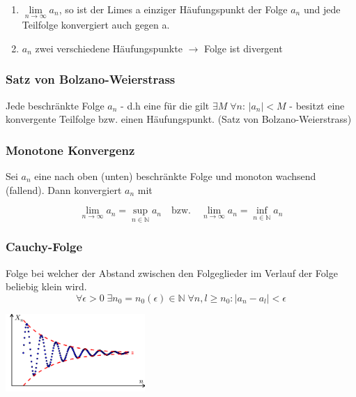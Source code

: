 \documentclass[6pt]{article}
\begin{document}
\begin{multicols*}{3}
\begin{enumerate}[label=(\roman*), itemsep=2pt, parsep=2pt]
		\item $\lim\limits_{n \to \infty}  a_n$, so ist der Limes a einziger H{\"a}ufungspunkt der Folge $a_n$ und jede Teilfolge konvergiert auch gegen a. 
		\item $a_n$ zwei verschiedene H{\"a}ufungspunkte $\rightarrow$ Folge ist divergent
\end{enumerate}



\subsubsection*{Satz von Bolzano-Weierstrass}
Jede beschr{\"a}nkte Folge $a_n$ - d.h eine f{\"u}r die gilt $\exists M \; \forall n:\, |a_n|<M$ - besitzt eine 
		konvergente Teilfolge bzw. einen H{\"a}ufungspunkt. (Satz von Bolzano-Weierstrass) 
		
\subsubsection*{Monotone Konvergenz}
				Sei $a_n$ eine nach oben (unten) beschr{\"a}nkte Folge und monoton wachsend (fallend). 	Dann konvergiert $a_n$ mit 
					
					\begin{equation*}
  							\lim_{n \to \infty} a_n = \sup_{n \in \mathbb{N}} a_n \quad \text{bzw.} \quad  \lim_{n \to \infty} a_n = \inf_{n \in\mathbb{N}} a_n
					\end{equation*}

\vspace{15mm}
\quad

\columnbreak

\subsubsection*{Cauchy-Folge}
Folge bei welcher der Abstand zwischen den Folgeglieder im Verlauf der Folge beliebig klein wird. 
\vspace{0mm}\\
\begin{equation*}
	\forall \epsilon>0 \; \exists n_0 = n_0(\epsilon) \in \mathbb{N} \; \forall n,l \geq n_0: | a_n - a_l | < \epsilon	
\end{equation*}

\begin{center}
	 \par
	\vspace{5mm}
	\includegraphics[width=150pt]{images/cauchy_folge}
\end{center}




\end{multicols*}
\end{document}
